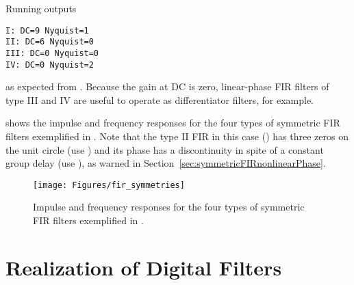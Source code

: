 Running  outputs 
\begin{verbatim}
I: DC=9 Nyquist=1
II: DC=6 Nyquist=0
III: DC=0 Nyquist=0
IV: DC=0 Nyquist=2
\end{verbatim}
as expected from . Because the gain at DC is zero, linear-phase FIR filters of type III and IV are useful to operate as differentiator filters, for example.

 shows the impulse and frequency responses for the four types of symmetric
FIR filters exemplified in . Note that the type II FIR in this
case () has three zeros on the unit circle (use ) 
and its phase has a discontinuity in spite of a constant group delay (use ), 
as warned in Section~\ref{sec:symmetricFIRnonlinearPhase}. 

\begin{figure}[htbp]
\centering
\texttt{[image: Figures/fir\_symmetries]}
\caption{Impulse and frequency responses for the four types of symmetric FIR filters
exemplified in .\label{fig:fir_symmetries}}
\end{figure}

\section{Realization of Digital Filters}

